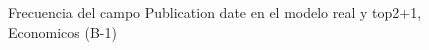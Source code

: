 \begin{figure}[H]
    \centering
    
    \caption{Frecuencia del campo Publication date en el modelo real y top2+1, Economicos (B-1)}
    \label{frecuency-Publication Date-top2+1}
\end{figure}